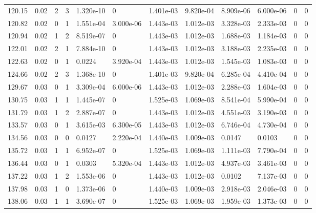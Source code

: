 \documentclass[preview]{standalone}
\begin{document}
{{{\begin{tabular}{L{1.2cm}C{1.2cm} C{0.3cm}C{0.5cm} C{1.4cm}C{1.4cm} C{1.4cm}C{1.4cm} C{1.6cm}C{1.6cm} C{1.6cm}C{1.6cm}}
  120.15  &  0.02  & 2     &  3 &  1.320e-10  & 0  &  1.401e-03&   9.820e-04& 8.909e-06 & 6.000e-06   &  0 & 0  \\ 
  120.82  &  0.02  & 0     &  1 &  1.551e-04  & 3.000e-06  &  1.443e-03&   1.012e-03& 3.328e-03 & 2.333e-03   &  0 & 0  \\ 
  120.94  &  0.02  & 1     &  2 &  8.519e-07  & 0  &  1.443e-03&   1.012e-03& 1.688e-03 & 1.184e-03   &  0 & 0  \\ 
  122.01  &  0.02  & 2     &  1 &  7.884e-10  & 0  &  1.443e-03&   1.012e-03& 3.188e-03 & 2.235e-03   &  0 & 0  \\ 
  122.63  &  0.02  & 0     &  1 &  0.0224  & 3.920e-04  &  1.443e-03&   1.012e-03& 1.545e-03 & 1.083e-03   &  0 & 0  \\ 
  124.66  &  0.02  & 2     &  3 &  1.368e-10  & 0  &  1.401e-03&   9.820e-04& 6.285e-04 & 4.410e-04   &  0 & 0  \\ 
  129.67  &  0.03  & 0     &  1 &  3.309e-04  & 6.000e-06  &  1.443e-03&   1.012e-03& 2.288e-03 & 1.604e-03   &  0 & 0  \\ 
  130.75  &  0.03  & 1     &  1 &  1.445e-07  & 0  &  1.525e-03&   1.069e-03& 8.541e-04 & 5.990e-04   &  0 & 0  \\ 
  131.79  &  0.03  & 1     &  2 &  2.887e-07  & 0  &  1.443e-03&   1.012e-03& 4.551e-03 & 3.190e-03   &  0 & 0  \\ 
  133.57  &  0.03  & 0     &  1 &  3.615e-03  & 6.300e-05  &  1.443e-03&   1.012e-03& 6.746e-04 & 4.730e-04   &  0 & 0  \\ 
  134.56  &  0.03  & 0     &  0 &  0.0127  & 2.220e-04  &  1.440e-03&   1.009e-03& 0.0147 & 0.0103   &  0 & 0  \\ 
  135.72  &  0.03  & 1     &  1 &  6.952e-07  & 0  &  1.525e-03&   1.069e-03& 1.111e-03 & 7.790e-04   &  0 & 0  \\ 
  136.44  &  0.03  & 0     &  1 &  0.0303  & 5.320e-04  &  1.443e-03&   1.012e-03& 4.937e-03 & 3.461e-03   &  0 & 0  \\ 
  137.22  &  0.03  & 1     &  2 &  1.553e-06  & 0  &  1.443e-03&   1.012e-03& 0.0102 & 7.137e-03   &  0 & 0  \\ 
  137.98  &  0.03  & 1     &  0 &  1.373e-06  & 0  &  1.440e-03&   1.009e-03& 2.918e-03 & 2.046e-03   &  0 & 0  \\ 
  138.06  &  0.03  & 1     &  1 &  3.690e-07  & 0  &  1.525e-03&   1.069e-03& 1.959e-03 & 1.373e-03   &  0 & 0  \\ 
\hline 
\end{tabular} 

}}}
\end{document}
